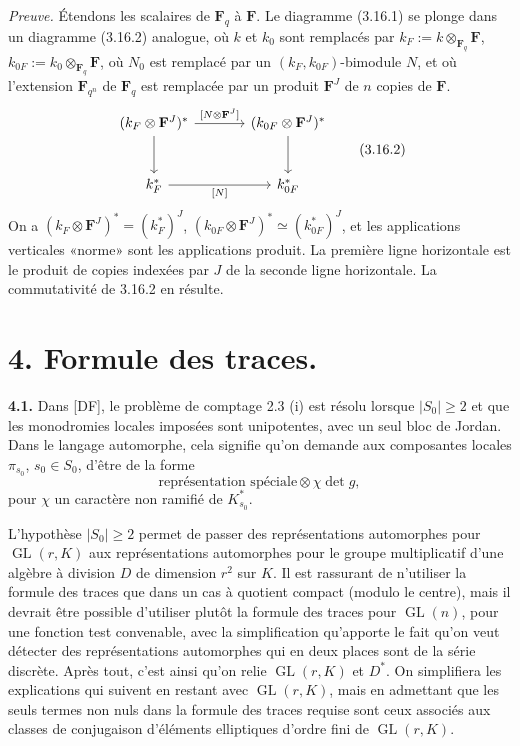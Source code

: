 \documentclass[11pt]{article}
\newcommand{\Fq}{\mathbf{F}_q}
\newcommand{\Fqn}{\mathbf{F}_{q^n}}
\newcommand{\F}{\mathbf{F}}
\newcommand{\GL}{\operatorname{GL}}
\newcommand{\para}[1]{\medskip\noindent\textbf{#1}\enspace}
\begin{document}
\textit{Preuve.} Étendons les scalaires de \(\Fq\) à \(\F\). Le diagramme (3.16.1) se plonge dans un diagramme (3.16.2) analogue, où \(k\) et \(k_0\) sont remplacés par \(k_F:=k\otimes_{\Fq}\F\), \(k_{0F}:=k_0\otimes_{\Fq}\F\), où \(N_0\) est remplacé par un \((k_F,k_{0F})\)-bimodule \(N\), et où l'extension \(\Fqn\) de \(\Fq\) est remplacée par un produit \(\F^J\) de \(n\) copies de \(\F\).
\begin{equation}
\begin{tikzcd}[column sep=large,row sep=large]
{(k_F\otimes\F^J)^*} \arrow[r,"{[N\otimes\F^J]}"] \arrow[d] & {(k_{0F}\otimes\F^J)^*} \arrow[d] \\
{k_F^*} \arrow[r,"{[N]}"'] & {k_{0F}^*}
\end{tikzcd}
\tag{3.16.2}
\end{equation}
On a \((k_F\otimes\F^J)^*=(k_F^*)^J\), \((k_{0F}\otimes\F^J)^*\simeq(k_{0F}^*)^J\), et les applications verticales «norme» sont les applications produit. La première ligne horizontale est le produit de copies indexées par \(J\) de la seconde ligne horizontale. La commutativité de 3.16.2 en résulte.



\section*{4. Formule des traces.}

\para{4.1.} Dans [DF], le problème de comptage 2.3 (i) est résolu lorsque \(|S_0|\geq 2\) et que les monodromies locales imposées sont unipotentes, avec un seul bloc de Jordan. Dans le langage automorphe, cela signifie qu'on demande aux composantes locales \(\pi_{s_0}\), \(s_0\in S_0\), d'être de la forme
\begin{equation}
  \text{représentation spéciale}\otimes \chi\det g,
\tag{4.1.1}
\end{equation}
pour \(\chi\) un caractère non ramifié de \(K_{s_0}^*\).

L'hypothèse \(|S_0|\geq 2\) permet de passer des représentations automorphes pour \(\GL(r,K)\) aux représentations automorphes pour le groupe multiplicatif d'une algèbre à division \(D\) de dimension \(r^2\) sur \(K\). Il est rassurant de n'utiliser la formule des traces que dans un cas à quotient compact (modulo le centre), mais il devrait être possible d'utiliser plutôt la formule des traces pour \(\GL(n)\), pour une fonction test convenable, avec la simplification qu'apporte le fait qu'on veut détecter des représentations automorphes qui en deux places sont de la série discrète. Après tout, c'est ainsi qu'on relie \(\GL(r,K)\) et \(D^*\). On simplifiera les explications qui suivent en restant avec \(\GL(r,K)\), mais en admettant que les seuls termes non nuls dans la formule des traces requise sont ceux associés aux classes de conjugaison d'éléments elliptiques d'ordre fini de \(\GL(r,K)\).
\end{document}
